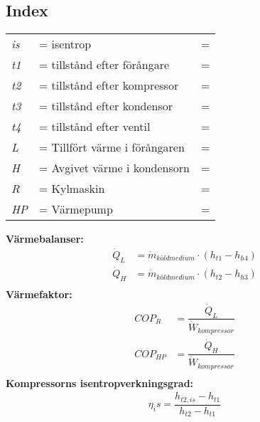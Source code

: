 \subsection*{Index}
	\begin{tabularx}{\linewidth} { l
	>{\raggedright\arraybackslash\hsize=1.5\hsize\linewidth=\hsize}X
	>{\raggedright\arraybackslash\hsize=0.5\hsize\linewidth=\hsize}X}
	\textit{is} & isentrop\\ 
	\textit{t1} & tillstånd efter förångare\\ 
	\textit{t2} & tillstånd efter kompressor\\ 
	\textit{t3} & tillstånd efter kondensor\\ 
	\textit{t4} & tillstånd efter ventil\\ 
	\textit{L} & Tillfört värme i förångaren\\ 
	\textit{H} & Avgivet värme i kondensorn\\ 
	\textit{R} & Kylmaskin\\ 
	\textit{HP} & Värmepump\\ 
	\end{tabularx}
	\textbf{Värmebalanser:}
	\begin{align*}
		{\dot{Q}}_{L} &  ={\dot{m}}_{\textit{köldmedium}}  \cdot (h_{t1} - h_{h4}) \\
		{\dot{Q}}_{H} &  ={\dot{m}}_{\textit{köldmedium}}  \cdot (h_{t2} - h_{h3}) \\
	\end{align*}
	\textbf{Värmefaktor:}
	\begin{align*}
		\textit{COP}_{R}  & =  \dfrac{{\dot{Q}}_{L}}{{\dot{W}}_{kompressor}}  \\
		\textit{COP}_{HP}  & =  \dfrac{{\dot{Q}}_{H}}{{\dot{W}}_{kompressor}}  \\
	\end{align*}
	\textbf{Kompressorns isentropverkningsgrad:}
	\begin{align*}
		\eta_is=\dfrac{h_{t2,is}-h_{t1}}{h_{t2}-h_{t1}}
	\end{align*}
